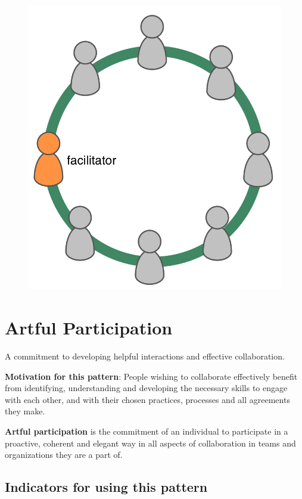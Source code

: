 \begin{figure}[htbp]
\centering
\includegraphics[keepaspectratio,width=\textwidth,height=0.75\textheight]{img/circle/facilitator.png}
\end{figure}

\section{Artful Participation}
\label{artfulparticipation}

A commitment to developing helpful interactions and effective collaboration.

\textbf{Motivation for this pattern}: People wishing to collaborate effectively benefit from identifying, understanding and developing the necessary skills to engage with each other, and with their chosen practices, processes and all agreements they make.

\textbf{Artful participation} is the commitment of an individual to participate in a proactive, coherent and elegant way in all aspects of collaboration in teams and organizations they are a part of.

\subsection{Indicators for using this pattern}
\label{indicatorsforusingthispattern}

